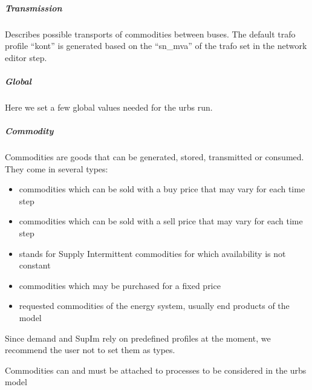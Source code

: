 \documentclass[letterpaper,10pt,english]{sphinxmanual}
\begin{document}
\subparagraph{Transmission}
\label{\detokenize{docs_gui/usage/urbs_setup:transmission}}
\begin{DUlineblock}{0em}
\item[] Describes possible transports of commodities between buses. The default trafo profile “kont” is generated based on the “sn\_mva” of the trafo set in the network editor step.
\end{DUlineblock}


\subparagraph{Global}
\label{\detokenize{docs_gui/usage/urbs_setup:global}}
\begin{DUlineblock}{0em}
\item[] Here we set a few global values needed for the urbs run.
\end{DUlineblock}


\subparagraph{Commodity}
\label{\detokenize{docs_gui/usage/urbs_setup:commodity}}
\begin{DUlineblock}{0em}
\item[] Commodities are goods that can be generated, stored, transmitted or consumed. They come in several types:
\end{DUlineblock}
\begin{itemize}
\item {} 
\sphinxAtStartPar
{} commodities which can be sold with a buy price that may vary for each time step

\item {} 
\sphinxAtStartPar
{} commodities which can be sold with a sell price that may vary for each time step

\item {} 
\sphinxAtStartPar
{} stands for Supply Intermittent commodities for which availability is not constant

\item {} 
\sphinxAtStartPar
{} commodities which may be purchased for a fixed price

\item {} 
\sphinxAtStartPar
{} requested commodities of the energy system, usually end products of the model

\end{itemize}

\begin{DUlineblock}{0em}
\item[] Since demand and SupIm rely on predefined profiles at the moment, we recommend the user not to set them as types.
\item[] Commodities can and must be attached to processes to be considered in the urbs model
\end{DUlineblock}
\end{document}
